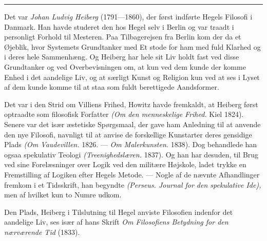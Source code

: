\documentclass[12pt,a4paper,openany]{book}
\newcommand{\opage}[1]{\marginnote{\footnotesize\textit{[#1]}}}
\begin{document}
\begin{center}\rule{2cm}{0.4pt}\end{center}

Det var \textit{Johan Ludvig Heiberg} (1791---1860), der først indførte Hegels
Filosofi i Danmark. Han havde studeret den hos Hegel selv i Berlin og var
traadt i personligt Forhold til Mesteren. Paa Tilbagerejsen fra Berlin kom der
da et Øjeblik, hvor Systemets Grundtanker med Et stode for ham med fuld Klarhed
og i deres hele Sammenhæng. Og Heiberg har hele sit Liv holdt fast ved disse
Grundtanker og ved Overbevisningen om, at kun ved dem kunde der komme Enhed i
det aandelige Liv, og at særligt Kunst og Religion kun ved at ses i Lyset af
dem kunde komme til at staa som fuldt berettigede Aandsformer.

Det var i den Strid om Villiens Frihed, Howitz havde
\setcounter{footnote}{0}%
\opage{130}fremkaldt, at Heiberg først optraadte som filosofisk Forfatter
\textit{(Om den menneskelige Frihed.} Kiel 1824). Senere var det især æstetiske
Spørgsmaal, der gave ham Anledning til at anvende den nye Filosofi, navnligt
til at anvise de forskellige Kunstarter deres gensidige Plads \textit{(Om
Vaudevillen.} 1826. --- \textit{Om Malerkunsten.} 1838). Dog behandlede han
ogsaa spekulativ Teologi \textit{(Treenighedslæren.} 1837). Og han har desuden,
til Brug ved sine Forelæsninger over Logik ved den militære Højskole, ladet
trykke en Fremstilling af Logiken efter Hegels Metode. --- Nogle af de nævnte
Afhandlinger fremkom i et Tidsskrift, han begyndte \textit{(Perseus. Journal
for den spekulative Ide),} men af hvilket kun to Numre udkom.

Den Plads, Heiberg i Tilslutning til Hegel anviste Filosofien indenfor det
aandelige Liv, ses især af hans Skrift \textit{Om Filosofiens Betydning for den
nærværende Tid} (1833).
\end{document}
